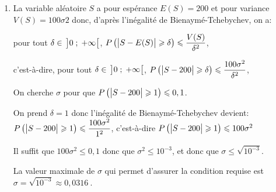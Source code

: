 \documentclass[10pt]{article}
\providecommand{\np}[2][]{{#2~#1}}
\providecommand{\ds}{\displaystyle}
\begin{document}
\begin{enumerate}
\begin{enumerate}
$\begin{aligned}[t]
199 < S < 201 
& \iff 199-200 < S - 200 < 201-200
\iff -1 < S-200 < 1\\
& \iff \left | S-200 \strut \right |<1
\end{aligned}$

Donc $P \left ( 199 < S < 201  \right ) = P \left ( \left | S-200 \strut \right |<1\right )$

En prenant l'événement contraire: 

$P \left ( \left | S-200 \strut \right |<1\right ) > 0,9
\iff P \left ( \left |S-200 \strut \right | \geqslant 1 \right ) \leqslant 0,1$

\item
La variable aléatoire $S$ a pour espérance $E(S)=200$ et pour variance $V(S)=100\sigma2$ donc, d'après l'inégalité de Bienaymé-Tchebychev, on a:

pour tout $\delta\in\, \left ]0\;;\;+\infty\strut \right [$, $P\left ( \left |S-E(S)\strut \right | \geqslant \delta \right ) \leqslant \dfrac{V(S)}{\delta^2}$, 

c'est-à-dire,
pour tout $\delta\in\, \left ]0\;;\;+\infty\strut \right [$, $P\left ( \left |S-200\strut \right | \geqslant \delta \right ) \leqslant \dfrac{100\sigma^2}{\delta^2}$, 

On cherche $\sigma$ pour que
$P \left ( \left |S-200 \strut \right | \geqslant 1 \right ) \leqslant 0,1$.

On prend $\delta=1$ donc l'inégalité de Bienaymé-Tchebychev devient:\\
$P\left ( \left |S-200\strut \right | \geqslant 1 \right ) \leqslant \dfrac{100\sigma^2}{1^2}$, c'est-à-dire
$P\left ( \left |S-200\strut \right | \geqslant 1 \right ) \leqslant 100\sigma^2$

Il suffit  que $100\sigma^2 \leqslant 0,1$ donc que $\sigma^2 \leqslant 10^{-3}$, et donc que $\sigma \leqslant \ds\sqrt{10^{-3}}$.

La valeur maximale de $\sigma$ qui permet d'assurer la condition requise est\\
 $\sigma= \ds \sqrt{10^{-3}}\approx \np{0,0316}$. 
	\end{enumerate}
\end{enumerate}
\end{document}
